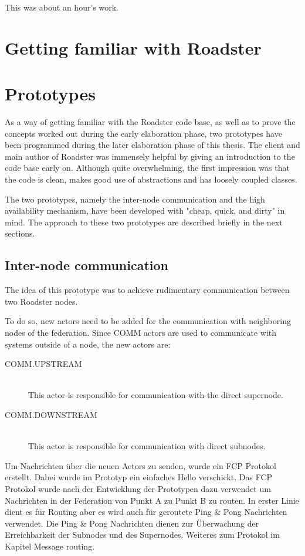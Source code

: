 This was about an hour's work.

\section{Getting familiar with Roadster}


\section{Prototypes}
As a way of getting familiar with the Roadster code base, as well as to prove
the concepts worked out during the early elaboration phase, two prototypes have
been programmed during the later elaboration phase of this thesis. The client
and main author of Roadster was immensely helpful by giving an introduction to
the code base early on.  Although quite overwhelming, the first impression was
that the code is clean, makes good use of abstractions and has loosely coupled
classes.


The two prototypes, namely the inter-node communication and the high availability
mechanism, have been developed with "cheap, quick, and dirty" in mind. The
approach to these two prototypes are described briefly in the next sections.


\subsection{Inter-node communication}
The idea of this prototype was to achieve rudimentary communication between two
Roadster nodes.

To do so, new actors need to be added for the communication with neighboring nodes of the
federation.  Since COMM actors are used to communicate with systems outside of
a node, the new actors are:
\begin{description}
\item [COMM.UPSTREAM]\hfill\\
This actor is responsible for communication with the direct supernode.
\item [COMM.DOWNSTREAM]\hfill\\
This actor is responsible for communication with direct subnodes.
\end{description}


Um Nachrichten über die neuen Actors zu senden, wurde ein FCP Protokol
erstellt. Dabei wurde im Prototyp ein einfaches Hello verschickt.
Das FCP Protokol wurde nach der Entwicklung der Prototypen dazu verwendet um Nachrichten 
in der Federation von Punkt A zu Punkt B zu routen. In erster Linie dient es für Routing aber es wird auch für geroutete
Ping \& Pong Nachrichten verwendet. Die Ping \& Pong Nachrichten
dienen zur Überwachung der Erreichbarkeit der Subnodes und des Supernodes.
Weiteres zum Protokol im Kapitel Message routing.


